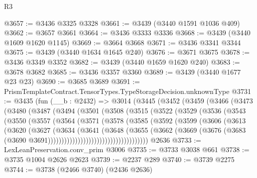 \begin{lexlean}{R3}
\begin{coremodule}
@3657 := @3436 @3325 @3328
@3661 := @3439 (@3440 @1591 @1036 @409)
@3662 := @3657 @3661
@3664 := @3436 @3333 @3336
@3668 := @3439 (@3440 @1609 @1620 @1145)
@3669 := @3664 @3668
@3671 := @3436 @3341 @3344
@3675 := @3439 (@3440 @1634 @1645 @240)
@3676 := @3671 @3675
@3678 := @3436 @3349 @3352
@3682 := @3439 (@3440 @1659 @1620 @240)
@3683 := @3678 @3682
@3685 := @3436 @3357 @3360
@3689 := @3439 (@3440 @1677 @23 @23)
@3690 := @3685 @3689
@3691 := PrismTemplateContract.TensorTypes.TypeStorageDecision.unknownType
@3731 := @3435
    (fun (__b : @2432) =>
    @3014
      (@3445
        (@3452
          (@3459
            (@3466
              (@3473
                (@3480
                  (@3487
                    (@3494
                      (@3501
                        (@3508
                          (@3515
                            (@3522
                              (@3529
                                (@3536
                                  (@3543
                                    (@3550
                                      (@3557
                                        (@3564
                                          (@3571
                                            (@3578
                                              (@3585
                                                (@3592
                                                  (@3599
                                                    (@3606
                                                      (@3613
                                                        (@3620
                                                          (@3627
                                                            (@3634
                                                              (@3641
                                                                (@3648
                                                                  (@3655
                                                                    (@3662
                                                                      (@3669
                                                                        (@3676
                                                                          (@3683
                                                                            (@3690
                                                                              @3691)))))))))))))))))))))))))))))))))))))
    @2636
@3733 := LexLeanPreservation.conv_prim @3006
@3735 := @3733 @3038 @661
@3738 := @3735 @1004 @2626 @2623
@3739 := @2237 @289
@3740 := @3739 @2275
@3744 := @3738 (@2466 @3740) (@2436 @2636)

\end{coremodule}
\end{lexlean}
